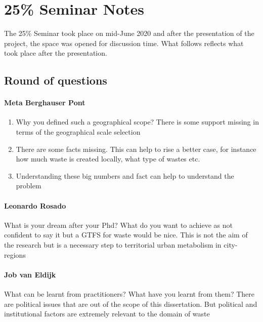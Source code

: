 \chapter{25\% Seminar Notes}
The 25\% Seminar took place on mid-June 2020 and after the presentation of the project, the space was opened for discussion time. What follows reflects what took place after the presentation.



\section{Round of questions}

\subsubsection{Meta Berghauser Pont}

\begin{enumerate}
    \item Why you defined such a geographical scope? There is some support missing in terms of the geographical scale selection
    
    \item There are some facts missing. This can help to rise a better case, for instance how much  waste is created locally, what type of wastes etc. 
    
    \item Understanding these big numbers and fact can help to understand the problem
    
\end{enumerate}

\subsubsection{Leonardo Rosado}
What is your dream after your Phd? What do you want to achieve as not confident to say it but a GTFS for waste would be nice. This is not the aim of the research but is a necessary step to territorial urban metabolism in city-regions

\subsubsection{Job van Eldijk}
What can be learnt from practitioners? What have you learnt from them?
There are political issues that are out of the scope of this dissertation. But political and institutional factors are extremely relevant to the domain of waste


